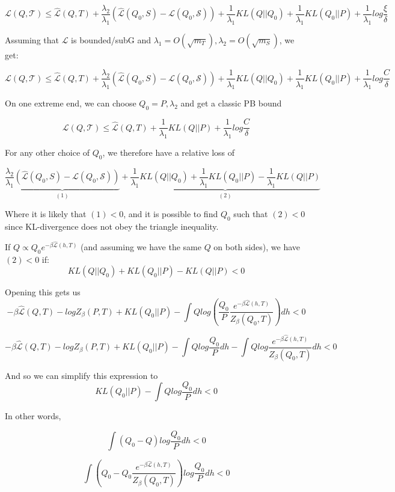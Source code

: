 \documentclass[letterpaper]{article}
\theoremstyle{definition}
\begin{document}
$$ \mathcal{L}(Q, \mathcal{T}) \leq \hat{\mathcal{L}}(Q,T) +\frac{\lambda_2}{\lambda_1} \left (\hat{\mathcal{L}}(Q_0,S)-\mathcal{L}(Q_0,\mathcal{S}) \right ) + \frac{1}{\lambda_1}KL(Q||Q_0)+\frac{1}{\lambda_1}KL(Q_0||P)+ \frac{1}{\lambda_1}log\frac{\xi}{\delta}$$

Assuming that $\mathcal{L}$ is bounded/subG and $\lambda_1=O(\sqrt{m_T}), \lambda_2=O(\sqrt{m_S})$, we get:

$$ \mathcal{L}(Q, \mathcal{T}) \leq \hat{\mathcal{L}}(Q,T) +\frac{\lambda_2}{\lambda_1} \left (\hat{\mathcal{L}}(Q_0,S)-\mathcal{L}(Q_0,\mathcal{S}) \right ) + \frac{1}{\lambda_1}KL(Q||Q_0)+\frac{1}{\lambda_1}KL(Q_0||P)+ \frac{1}{\lambda_1}log\frac{C}{\delta}$$

On one extreme end, we can choose $Q_0=P, \lambda_2$ and get a classic PB bound

$$ \mathcal{L}(Q, \mathcal{T}) \leq \hat{\mathcal{L}}(Q,T) +\frac{1}{\lambda_1}KL(Q||P)+ \frac{1}{\lambda_1}log\frac{C}{\delta}$$

For any other choice of $Q_0$, we therefore have a relative loss of

$$\underbrace{\frac{\lambda_2}{\lambda_1} \left (\hat{\mathcal{L}}(Q_0,S)-\mathcal{L}(Q_0,\mathcal{S}) \right )}_{(1)} + \underbrace{\frac{1}{\lambda_1}KL(Q||Q_0)+\frac{1}{\lambda_1}KL(Q_0||P)-\frac{1}{\lambda_1}KL(Q||P)}_{(2)}$$

Where it is likely that $(1)<0$, and it is possible to find $Q_0$ such that $(2)<0$ since  KL-divergence does not obey the triangle inequality.

If $Q\propto Q_0 e^{-\beta \hat{\mathcal{L}}(h,T)}$ (and assuming we have the same $Q$ on both sides), we have $(2)<0$ if:
$$ KL(Q||Q_0)+KL(Q_0||P)-KL(Q||P) < 0$$

Opening this gets us 
$$ -\beta \hat{\mathcal{L}}(Q,T)-logZ_{\beta}(P,T)+KL(Q_0||P)-\int Qlog\left (\frac{Q_0}{P}\frac{e^{-\beta \hat{\mathcal{L}}(h,T)}}{Z_\beta(Q_0,T)}\right )dh<0$$

$$ -\beta \hat{\mathcal{L}}(Q,T)-logZ_{\beta}(P,T)+KL(Q_0||P)-\int Qlog\frac{Q_0}{P}dh-\int Qlog\frac{e^{-\beta \hat{\mathcal{L}}(h,T)}}{Z_\beta(Q_0,T)}dh<0$$

And so we can simplify this expression to
$$ KL(Q_0||P)-\int Qlog\frac{Q_0}{P}dh<0$$

In other words, 

$$\int (Q_0-Q)log\frac{Q_0}{P}dh<0$$

$$\int \left (Q_0-Q_0\frac{e^{-\beta\hat{\mathcal{L}}(h,T)}}{Z_{\beta}(Q_0,T)}\right )log\frac{Q_0}{P}dh<0$$
\end{document}

